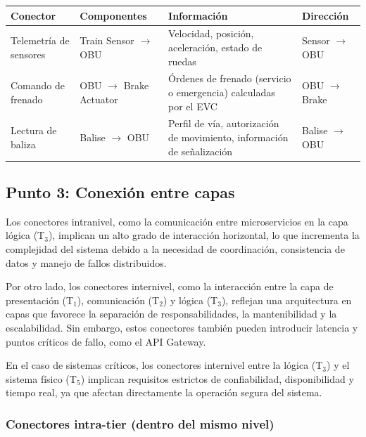 \documentclass[a4paper, 10 pt]{article}
\begin{document}
\begin{table}[H]
\centering
\footnotesize
\begin{tabular}{|R{0.18\textwidth}|R{0.2\textwidth}|R{0.32\textwidth}|M{0.14\textwidth}|}
\hline
\textbf{Conector} & \textbf{Componentes} & \textbf{Información} & \textbf{Dirección} \\
\hline
Telemetría de sensores & Train Sensor $\rightarrow$ OBU & Velocidad, posición, aceleración, estado de ruedas & Sensor $\rightarrow$ OBU \\
\hline
Comando de frenado & OBU $\rightarrow$ Brake Actuator & Órdenes de frenado (servicio o emergencia) calculadas por el EVC & OBU $\rightarrow$ Brake \\
\hline
Lectura de baliza & Balise $\rightarrow$ OBU & Perfil de vía, autorización de movimiento, información de señalización & Balise $\rightarrow$ OBU \\
\hline
\end{tabular}
\end{table}

\subsection{Punto 3: Conexión entre capas}

Los conectores intranivel, como la comunicación entre microservicios en la capa lógica (T$_3$), implican un alto grado de interacción horizontal, lo que incrementa la complejidad del sistema debido a la necesidad de coordinación, consistencia de datos y manejo de fallos distribuidos.

Por otro lado, los conectores internivel, como la interacción entre la capa de presentación (T$_1$), comunicación (T$_2$) y lógica (T$_3$), reflejan una arquitectura en capas que favorece la separación de responsabilidades, la mantenibilidad y la escalabilidad. Sin embargo, estos conectores también pueden introducir latencia y puntos críticos de fallo, como el API Gateway.

En el caso de sistemas críticos, los conectores internivel entre la lógica (T$_3$) y el sistema físico (T$_5$) implican requisitos estrictos de confiabilidad, disponibilidad y tiempo real, ya que afectan directamente la operación segura del sistema.

\subsubsection{Conectores intra-tier (dentro del mismo nivel)}
\end{document}
